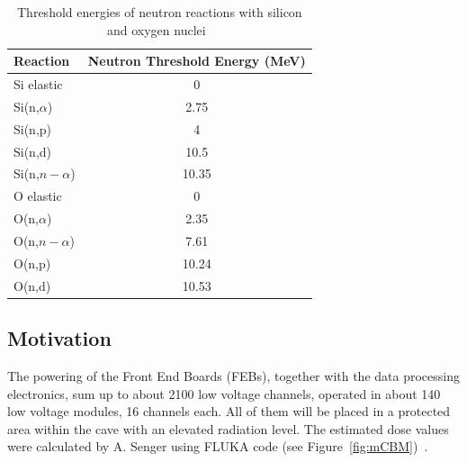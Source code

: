 \begin{table}[!h]
\centering
\begin{tabular}{lc}
\hline
Reaction         & Neutron Threshold Energy (MeV) \\ \hline
Si elastic       & 0                              \\
Si(n,$\alpha$)   & 2.75                           \\
Si(n,p)          & 4                              \\
Si(n,d)          & 10.5                           \\
Si(n,$n-\alpha$) & 10.35                          \\ \hline
O elastic        & 0                              \\
O(n,$\alpha$)    & 2.35                           \\
O(n,$n-\alpha$)  & 7.61                           \\
O(n,p)           & 10.24                          \\
O(n,d)           & 10.53                         
\end{tabular}
\caption{Threshold energies of neutron reactions with silicon and oxygen nuclei~\cite{ENDF}}
\label{cross-seciton}
\end{table}

\subsection{Motivation}

The powering of the Front End Boards (\gls{FEB}s), together with the data processing electronics, sum up to about 2100 low voltage channels, operated in about 140 low voltage modules, 16 channels each. All of them will be placed in a protected area within the cave with an elevated radiation level. The estimated dose values were calculated by A. Senger using FLUKA code (see Figure~\ref{fig:mCBM})~\cite{FLUKA}. 

